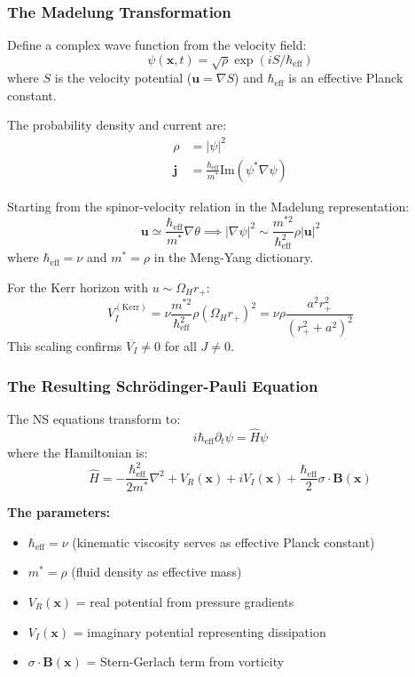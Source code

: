 \documentclass[11pt]{article}
\begin{document}
\subsubsection{The Madelung Transformation}

Define a complex wave function from the velocity field:
\begin{equation}
\psi(\mathbf{x},t) = \sqrt{\rho} \exp(iS/\hbar_{\text{eff}})
\end{equation}
where $S$ is the velocity potential ($\mathbf{u} = \nabla S$) and $\hbar_{\text{eff}}$ is an effective Planck constant.

The probability density and current are:
\begin{align}
\rho &= |\psi|^2 \\
\mathbf{j} &= \frac{\hbar_{\text{eff}}}{m^*} \text{Im}(\psi^* \nabla \psi)
\end{align}

Starting from the spinor-velocity relation in the Madelung representation:
\begin{equation}
\mathbf{u} \simeq \frac{\hbar_{\text{eff}}}{m^*}\nabla\theta \implies |\nabla\psi|^2 \sim \frac{m^{*2}}{\hbar_{\text{eff}}^2}\rho|\mathbf{u}|^2
\end{equation}
where $\hbar_{\text{eff}} = \nu$ and $m^* = \rho$ in the Meng-Yang dictionary.

For the Kerr horizon with $u \sim \Omega_H r_+$:
\begin{equation}
V_I^{(\text{Kerr})} = \nu\frac{m^{*2}}{\hbar_{\text{eff}}^2}\rho(\Omega_H r_+)^2 = \nu\rho\frac{a^2 r_+^2}{(r_+^2 + a^2)^2}
\end{equation}
This scaling confirms $\overline{V_I} \neq 0$ for all $J \neq 0$.

\subsubsection{The Resulting Schr\"odinger-Pauli Equation}

The NS equations transform to:
\begin{equation}
i\hbar_{\text{eff}} \partial_t \psi = \hat{H}\psi
\end{equation}
where the Hamiltonian is:
\begin{equation}
\hat{H} = -\frac{\hbar^2_{\text{eff}}}{2m^*} \nabla^2 + V_R(\mathbf{x}) + iV_I(\mathbf{x}) + \frac{\hbar_{\text{eff}}}{2}\sigma \cdot \mathbf{B}(\mathbf{x})
\end{equation}

\textbf{The parameters:}
\begin{itemize}
\item $\hbar_{\text{eff}} = \nu$ (kinematic viscosity serves as effective Planck constant)
\item $m^* = \rho$ (fluid density as effective mass)
\item $V_R(\mathbf{x})$ = real potential from pressure gradients
\item $V_I(\mathbf{x})$ = imaginary potential representing dissipation
\item $\sigma \cdot \mathbf{B}(\mathbf{x})$ = Stern-Gerlach term from vorticity
\end{itemize}
\end{document}
